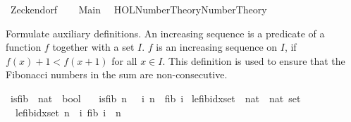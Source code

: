 %
\begin{isabellebody}%
%
%
\isadelimdocument
%
\endisadelimdocument
%
\isatagdocument
%
\isamarkuptrue%
%
\endisatagdocument
{\isafolddocument}%
%
\isadelimdocument
%
\endisadelimdocument
%
\isadelimtheory
%
\endisadelimtheory
%
\isatagtheory
{}\isamarkupfalse%
\ Zeckendorf\isanewline
\isanewline
{}\ \isanewline
\ \ Main\isanewline
\ \ {\isachardoublequoteopen}HOL{\isacharminus}{\kern0pt}Number{\isacharunderscore}{\kern0pt}Theory{\isachardot}{\kern0pt}Number{\isacharunderscore}{\kern0pt}Theory{\isachardoublequoteclose}\isanewline
\isanewline
{}%
\endisatagtheory
{\isafoldtheory}%
%
\isadelimtheory
%
\endisadelimtheory
%
\isadelimdocument
%
\endisadelimdocument
%
\isatagdocument
%
\isamarkuptrue%
%
\endisatagdocument
{\isafolddocument}%
%
\isadelimdocument
%
\endisadelimdocument
%
\begin{isamarkuptext}%
Formulate auxiliary definitions. An increasing sequence is a predicate of a function $f$
  together with a set $I$. $f$ is an increasing sequence on $I$, if $f(x)+1 < f(x+1)$ 
  for all $x \in I$. This definition is used to ensure that the Fibonacci numbers in the sum are
  non-consecutive.%
\end{isamarkuptext}\isamarkuptrue%
\isamarkupfalse%
\ is{\isacharunderscore}{\kern0pt}fib\ {\isacharcolon}{\kern0pt}{\isacharcolon}{\kern0pt}\ {\isachardoublequoteopen}nat\ {\isasymRightarrow}\ bool{\isachardoublequoteclose}\ \isanewline
\ \ {\isachardoublequoteopen}is{\isacharunderscore}{\kern0pt}fib\ n\ {\isacharequal}{\kern0pt}\ {\isacharparenleft}{\kern0pt}{\isasymexists}\ i{\isachardot}{\kern0pt}\ n\ {\isacharequal}{\kern0pt}\ fib\ i{\isacharparenright}{\kern0pt}{\isachardoublequoteclose}\isanewline
\isanewline
{}\isamarkupfalse%
\ le{\isacharunderscore}{\kern0pt}fib{\isacharunderscore}{\kern0pt}idx{\isacharunderscore}{\kern0pt}set\ {\isacharcolon}{\kern0pt}{\isacharcolon}{\kern0pt}\ {\isachardoublequoteopen}nat\ {\isasymRightarrow}\ nat\ set{\isachardoublequoteclose}\ \isanewline
\ \ {\isachardoublequoteopen}le{\isacharunderscore}{\kern0pt}fib{\isacharunderscore}{\kern0pt}idx{\isacharunderscore}{\kern0pt}set\ n\ {\isacharequal}{\kern0pt}\ {\isacharbraceleft}{\kern0pt}i\ {\isachardot}{\kern0pt}fib\ i\ {\isacharless}{\kern0pt}\ n{\isacharbraceright}{\kern0pt}{\isachardoublequoteclose}\isanewline
\isanewline
{}\isamarkupfalse%

\end{isabellebody}
